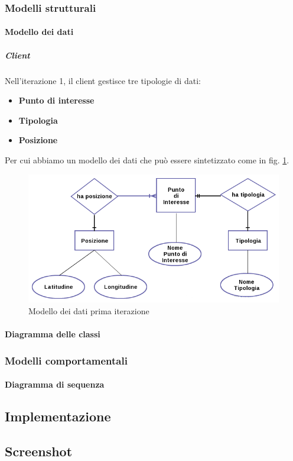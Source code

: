 \subsubsection{Modelli strutturali}
\paragraph{Modello dei dati}
\subparagraph{Client}
Nell'iterazione 1, il client gestisce tre tipologie di dati:
\begin{itemize}
\item \textbf{Punto di interesse}
\item \textbf{Tipologia}
\item \textbf{Posizione}
\end{itemize}
Per cui abbiamo un modello dei dati che può essere sintetizzato come in fig. \ref{datamodel1iterazione}.
\begin{figure}
\includegraphics[scale=0.55]{imgs/model/DataModel1.png} 
\caption{Modello dei dati prima iterazione\label{datamodel1iterazione}}
\end{figure}

\paragraph{Diagramma delle classi}

\subsubsection{Modelli comportamentali}
\paragraph{Diagramma di sequenza}
\subsection{Implementazione}
\subsection{Screenshot}

\clearpage

\clearpage{\pagestyle{empty}\cleardoublepage}